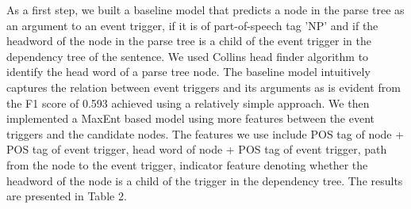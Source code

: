 \begin{enumerate}
As a first step, we built a baseline model that predicts a node in the parse tree as an argument to an event trigger, if it is of part-of-speech tag 'NP' and if the headword of the node in the parse tree is a child of the event trigger in the dependency tree of the sentence. We used Collins head finder algorithm to identify the head word of a parse tree node. The baseline model intuitively captures the relation between event triggers and its arguments as is evident from the F1 score of 0.593 achieved using a relatively simple approach. We then implemented a MaxEnt based model using more features between the event triggers and the candidate nodes. The features we use include POS tag of node + POS tag of event trigger, head word of node + POS tag of event trigger, path from the node to the event trigger, indicator feature denoting whether the headword of the node is a child of the trigger in the dependency tree. The results are presented in Table 2.

\end{enumerate}